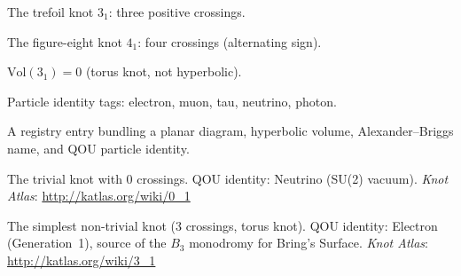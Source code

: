 \begin{definition}
  \label{def:trefoil-diagram}
  \leanok
  The trefoil knot $3_1$: three positive crossings.
\end{definition}

\begin{definition}
  \label{def:figure-eight-diagram}
  \leanok
  The figure-eight knot $4_1$: four crossings (alternating sign).
\end{definition}

\begin{definition}
  \label{def:vol-trefoil}
  \leanok
  $\mathrm{Vol}(3_1) = 0$ (torus knot, not hyperbolic).
\end{definition}

\begin{definition}
  \label{def:qou-identity}
  \leanok
  Particle identity tags: electron, muon, tau, neutrino, photon.
\end{definition}

\begin{definition}
  \label{def:knot-entry}
  \leanok
  A registry entry bundling a planar diagram, hyperbolic volume,
  Alexander--Briggs name, and QOU particle identity.
\end{definition}

\begin{definition}[Unknot ($0_1$)]
  \label{def:unknot}
  \leanok
  The trivial knot with 0 crossings.  QOU identity: Neutrino (SU(2) vacuum).
  \textit{Knot Atlas}: \url{http://katlas.org/wiki/0_1}
\end{definition}

\begin{definition}[Trefoil ($3_1$)]
  \label{def:trefoil}
  \leanok
  The simplest non-trivial knot (3 crossings, torus knot).
  QOU identity: Electron (Generation~1), source of the $B_3$ monodromy
  for Bring's Surface.
  \textit{Knot Atlas}: \url{http://katlas.org/wiki/3_1}
\end{definition}

